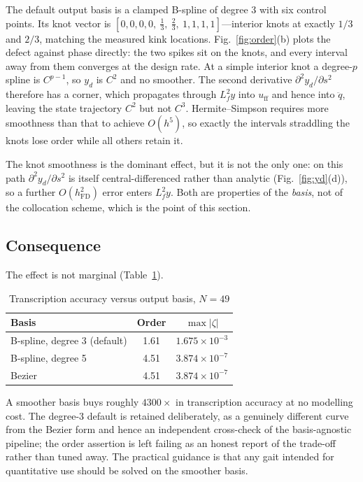\documentclass[10pt,conference]{IEEEtran}
\begin{document}
The default output basis is a clamped B-spline of degree 3 with six control
points. Its knot vector is
$[0,0,0,0,\ \tfrac13,\ \tfrac23,\ 1,1,1,1]$---interior knots at exactly
$1/3$ and $2/3$, matching the measured kink locations. Fig.~\ref{fig:order}(b)
plots the defect against phase directly: the two spikes sit on the knots, and
every interval away from them converges at the design rate. At a simple interior
knot a degree-$p$ spline is $C^{p-1}$, so $y_d$ is $C^2$ and no smoother. The second
derivative $\partial^2 y_d/\partial s^2$ therefore has a corner, which
propagates through $L_f^2y$ into $u_{\mathrm{ff}}$ and hence into $\ddot q$,
leaving the state trajectory $C^2$ but not $C^3$. Hermite--Simpson requires
more smoothness than that to achieve $O(h^5)$, so exactly the intervals
straddling the knots lose order while all others retain it.

The knot smoothness is the dominant effect, but it is not the only one: on this
path $\partial^2 y_d/\partial s^2$ is itself central-differenced rather than
analytic (Fig.~\ref{fig:yd}(d)), so a further $O(h_{\mathrm{FD}}^2)$ error
enters $L_f^2 y$. Both are properties of the \emph{basis}, not of the
collocation scheme, which is the point of this section.

\subsection{Consequence}

The effect is not marginal (Table~\ref{tab:basis}).

\begin{table}[t]
\caption{Transcription accuracy versus output basis, $N=49$}
\label{tab:basis}
\centering
\begin{tabular}{lcc}
\toprule
Basis & Order & $\max|\zeta|$ \\
\midrule
B-spline, degree 3 (default) & 1.61 & $1.675\times10^{-3}$ \\
B-spline, degree 5           & 4.51 & $3.874\times10^{-7}$ \\
Bezier                       & 4.51 & $3.874\times10^{-7}$ \\
\bottomrule
\end{tabular}
\end{table}

A smoother basis buys roughly $4300\times$ in transcription accuracy at no
modelling cost. The degree-3 default is retained deliberately, as a genuinely
different curve from the Bezier form and hence an independent cross-check of the
basis-agnostic pipeline; the order assertion is left failing as an honest
report of the trade-off rather than tuned away. The practical guidance is that
any gait intended for quantitative use should be solved on the smoother basis.
\end{document}
